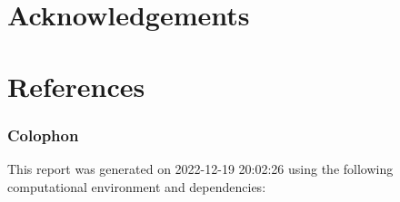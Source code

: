 \documentclass[
  number]{elsarticle}
\newlength{\cslhangindent}
\newlength{\cslentryspacingunit} %
\newenvironment{CSLReferences}[2] %
 {%
  \setlength{\parindent}{0pt}
  \ifodd #1
  \let\oldpar\par
  \def\par{\hangindent=\cslhangindent\oldpar}
  \fi
  \setlength{\parskip}{#2\cslentryspacingunit}
 }%
 {}
\begin{document}
\hypertarget{acknowledgements}{%
\section{Acknowledgements}\label{acknowledgements}}

\newpage

\hypertarget{references}{%
\section{References}\label{references}}

\hypertarget{refs}{}
\begin{CSLReferences}{0}{0}
\end{CSLReferences}

\newpage

\hypertarget{colophon}{%
\subsubsection{Colophon}\label{colophon}}

This report was generated on 2022-12-19 20:02:26 using the following
computational environment and dependencies:
\end{document}
